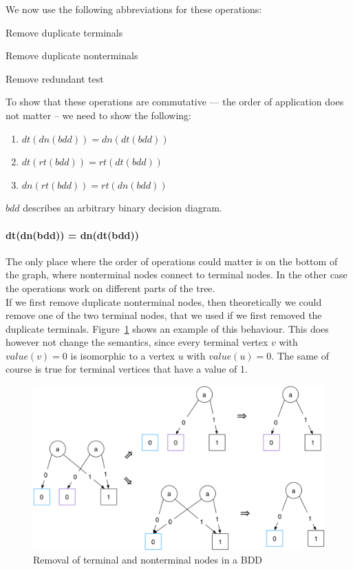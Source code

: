 \documentclass[a4paper, 11pt]{article}
\begin{document}
We now use the following abbreviations for these operations:

\begin{description}[style=multiline]
    \item[dt()] Remove duplicate terminals
    \item[dn()] Remove duplicate nonterminals
    \item[rt()] Remove redundant test
\end{description}

To show that these operations are commutative — the order of application does not matter – we need to show the following:

\begin{enumerate}
    \item $dt(dn(bdd)) = dn(dt(bdd))$
    \item $dt(rt(bdd)) = rt(dt(bdd))$
    \item $dn(rt(bdd)) = rt(dn(bdd))$
\end{enumerate}

$bdd$ describes an arbitrary binary decision diagram.

\paragraph{dt(dn(bdd)) = dn(dt(bdd))}

The only place where the order of operations could matter is on the bottom of the graph, where nonterminal nodes connect to terminal nodes. In the other case the operations work on different parts of the tree.\\

If we first remove duplicate nonterminal nodes, then theoretically we could remove one of the two terminal nodes, that we used if we first removed the duplicate terminals. Figure~\ref{fig:Figures_BDD_Removed_Terminals_And_Nonterminals} shows an example of this behaviour. This does however not change the semantics, since every terminal vertex $v$ with $value(v)=0$ is isomorphic to a vertex $u$ with $value(u)=0$. The same of course is true for terminal vertices that have a value of 1.

\begin{figure}[h]
  \centering
    \includegraphics[width=.9\textwidth]{Figures/BDD Removed Terminals And Nonterminals.pdf}
  \caption{Removal of terminal and nonterminal nodes in a BDD}
  \label{fig:Figures_BDD_Removed_Terminals_And_Nonterminals}
\end{figure}
\end{document}
